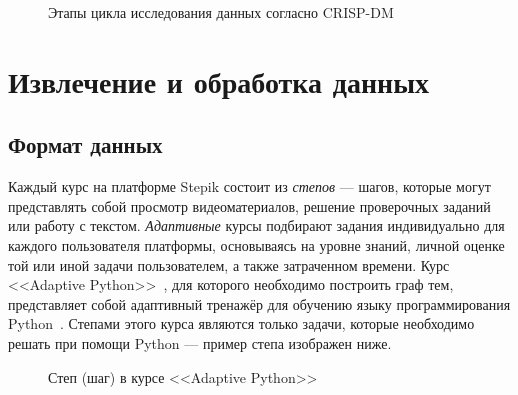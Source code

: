 \documentclass[14pt]{matmex-diploma-custom}
\begin{document}
\begin{figure}[!htb]
\caption{Этапы цикла исследования данных согласно CRISP-DM}
\label{crispdm}
\end{figure}

\section{Извлечение и обработка данных}
\subsection{Формат данных}
Каждый курс на платформе Stepik состоит из \textit{степов} --- шагов, которые могут представлять собой просмотр видеоматериалов, решение проверочных заданий или работу с текстом. \textit{Адаптивные} курсы подбирают задания индивидуально для каждого пользователя платформы, основываясь на уровне знаний, личной оценке той или иной задачи пользователем, а также затраченном времени. Курс <<Adaptive Python>>~\cite{adapython}, для которого необходимо построить граф тем, представляет собой адаптивный тренажёр для обучению языку программирования Python~\cite{Python}. Степами этого курса являются только задачи, которые необходимо решать при помощи Python --- пример степа изображен ниже.

\begin{figure}[!htb]
\caption{Степ (шаг) в курсе <<Adaptive Python>>}
\label{step}
\end{figure}
\end{document}
